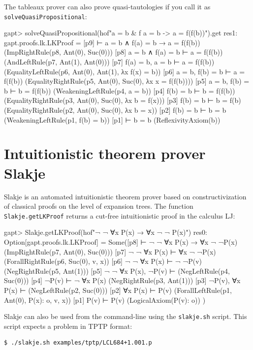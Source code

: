 \documentclass[a4paper,11pt]{book}
\begin{document}
The tableaux prover can also prove quasi-tautologies if you call it as \texttt{solveQuasiPropositional}:
\begin{clilisting}
gapt> solveQuasiPropositional(hof"a = b & f a = b -> a = f(f(b))").get
res1: gapt.proofs.lk.LKProof =
[p9]  ⊢ a = b ∧ f(a) = b → a = f(f(b))    (ImpRightRule(p8, Ant(0), Suc(0)))
[p8] a = b ∧ f(a) = b ⊢ a = f(f(b))    (AndLeftRule(p7, Ant(1), Ant(0)))
[p7] f(a) = b, a = b ⊢ a = f(f(b))    (EqualityLeftRule(p6, Ant(0), Ant(1), λx f(x) = b))
[p6] a = b, f(b) = b ⊢ a = f(f(b))    (EqualityRightRule(p5, Ant(0), Suc(0), λx x = f(f(b))))
[p5] a = b, f(b) = b ⊢ b = f(f(b))    (WeakeningLeftRule(p4, a = b))
[p4] f(b) = b ⊢ b = f(f(b))    (EqualityRightRule(p3, Ant(0), Suc(0), λx b = f(x)))
[p3] f(b) = b ⊢ b = f(b)    (EqualityRightRule(p2, Ant(0), Suc(0), λx b = x))
[p2] f(b) = b ⊢ b = b    (WeakeningLeftRule(p1, f(b) = b))
[p1]  ⊢ b = b    (ReflexivityAxiom(b))

\end{clilisting}

\section{Intuitionistic theorem prover Slakje}

Slakje is an automated intuitionistic theorem prover based on
constructivization of classical proofs on the level of expansion trees.  The
function \texttt{Slakje.getLKProof} returns a cut-free intuitionistic proof in
the calculus LJ:
\begin{clilisting}
gapt> Slakje.getLKProof(hof"¬ ¬ ∀x P(x) → ∀x ¬ ¬ P(x)")
res0: Option[gapt.proofs.lk.LKProof] =
Some([p8]  ⊢ ¬ ¬ ∀x P(x) → ∀x ¬ ¬P(x)    (ImpRightRule(p7, Ant(0), Suc(0)))
[p7] ¬ ¬ ∀x P(x) ⊢ ∀x ¬ ¬P(x)    (ForallRightRule(p6, Suc(0), v, x))
[p6] ¬ ¬ ∀x P(x) ⊢ ¬ ¬P(v)    (NegRightRule(p5, Ant(1)))
[p5] ¬ ¬ ∀x P(x), ¬P(v) ⊢     (NegLeftRule(p4, Suc(0)))
[p4] ¬P(v) ⊢ ¬ ∀x P(x)    (NegRightRule(p3, Ant(1)))
[p3] ¬P(v), ∀x P(x) ⊢     (NegLeftRule(p2, Suc(0)))
[p2] ∀x P(x) ⊢ P(v)    (ForallLeftRule(p1, Ant(0), P(x): o, v, x))
[p1] P(v) ⊢ P(v)    (LogicalAxiom(P(v): o))
)

\end{clilisting}

Slakje can also be used from the command-line using the \texttt{slakje.sh}
script.  This script expects a problem in TPTP format:
\begin{lstlisting}
$ ./slakje.sh examples/tptp/LCL684+1.001.p
\end{lstlisting}
\end{document}
